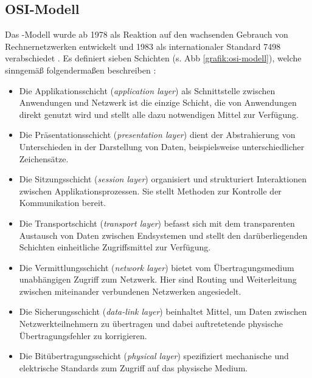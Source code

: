 \subsection{OSI-Modell}
Das -Modell wurde ab 1978 als Reaktion auf den wachsenden Gebrauch von Rechnernetzwerken entwickelt und 1983 als internationaler Standard  7498 verabschiedet \autocite[Vgl.][1334]{Day1983}. Es definiert sieben Schichten (s. Abb \ref{grafik:osi-modell}), welche \citeauthor{Day1983} sinngemäß folgendermaßen beschreiben \autocite[Vgl.][1334]{Day1983}:
\begin{itemize}
\item Die Applikationsschicht (\textit{application layer}) als Schnittstelle zwischen Anwendungen und Netzwerk ist die einzige Schicht, die von Anwendungen direkt genutzt wird und stellt alle dazu notwendigen Mittel zur Verfügung. 
\item Die Präsentationsschicht (\textit{presentation layer}) dient der Abstrahierung von Unterschieden in der Darstellung von Daten, beispielsweise unterschiedlicher Zeichensätze.
\item Die Sitzungsschicht (\textit{session layer}) organisiert und strukturiert Interaktionen zwischen Applikationsprozessen. Sie stellt Methoden zur Kontrolle der Kommunikation bereit.
\item Die Transportschicht (\textit{transport layer}) befasst sich mit dem transparenten Austausch von Daten zwischen Endsystemen und stellt den darüberliegenden Schichten einheitliche Zugriffsmittel zur Verfügung.
\item Die Vermittlungsschicht (\textit{network layer}) bietet vom Übertragungsmedium unabhängigen Zugriff zum Netzwerk. Hier sind Routing und Weiterleitung zwischen miteinander verbundenen Netzwerken angesiedelt.
\item Die Sicherungsschicht (\textit{data-link layer}) beinhaltet Mittel, um Daten zwischen Netzwerkteilnehmern zu übertragen und dabei auftretetende physische Übertragungsfehler zu korrigieren.
\item Die Bitübertragungsschicht (\textit{physical layer}) spezifiziert mechanische und elektrische Standards zum Zugriff auf das physische Medium.
\end{itemize}
